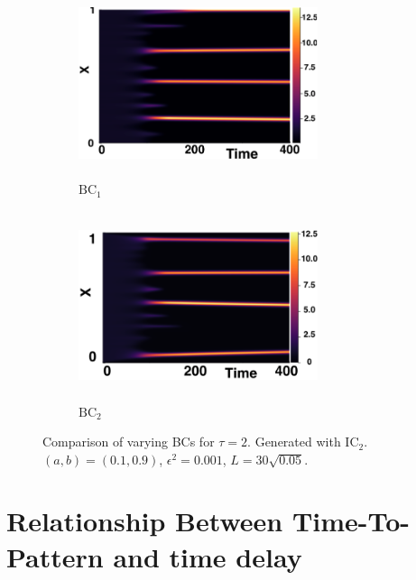 \begin{figure}[H]
    \centering
    \begin{subfigure}[b]{0.45\textwidth}
        \centering
        \includegraphics[width=7cm,height=5.5cm]{ic22.png}
        \caption{$\text{BC}_1$}
        \label{}
    \end{subfigure}
    \hfill
    \begin{subfigure}[b]{0.45\textwidth}
        \centering
        \includegraphics[width=7cm,height=5.5cm]{bc2.png}
        \caption{$\text{BC}_2$}
        \label{}
    \end{subfigure}
    \caption{Comparison of varying BCs for $\tau=2$. Generated with $\text{IC}_2$. $(a,b)=(0.1,0.9)$, $\epsilon^2=0.001$, $L=30\sqrt{0.05}$.}
    \label{fig:bctau3}
\end{figure}

\section{Relationship Between Time-To-Pattern and time delay}\label{section:delaypatt}

